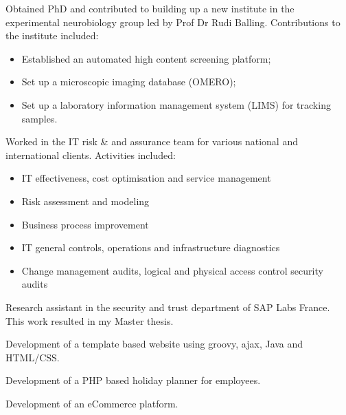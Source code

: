 \documentclass[11pt,a4paper,nolmodern]{moderncv}        %
\begin{document}

{Obtained PhD and contributed to building up a new institute in the experimental neurobiology group led by Prof Dr Rudi Balling. \newline{} Contributions to the institute included:
\begin{itemize}%
	\item Established an automated high content screening platform;
	\item Set up a microscopic imaging database (OMERO);
	\item Set up a laboratory information management system (LIMS) for tracking samples.
\end{itemize}}


{Worked in the IT risk \& and assurance team for various national and international clients. \newline{} Activities included:
\begin{itemize}
	\item IT effectiveness, cost optimisation and service management
	\item Risk assessment and modeling
	\item Business process improvement
	\item IT general controls, operations and infrastructure diagnostics
	\item Change management audits, logical and physical access control security audits
\end{itemize}}


{Research assistant in the security and trust department of SAP Labs France. This work resulted in my Master thesis.}

{Development of a template based website using groovy, ajax, Java and HTML/CSS.}{}

{Development of a PHP based holiday planner for employees.}

{Development of an eCommerce platform.}
\end{document}

